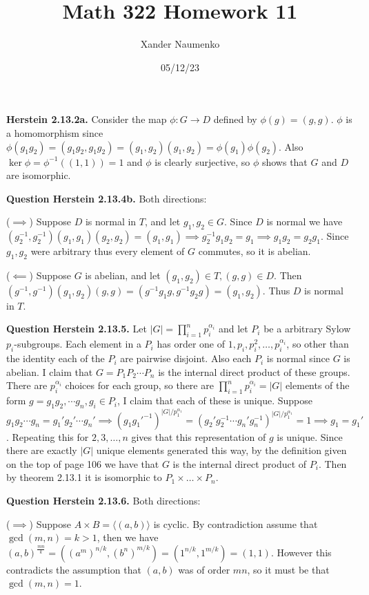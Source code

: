 \documentclass[letterpaper, reqno,11pt]{article}
\begin{document}
\title{Math 322 Homework 11}
\date{05/12/23}
\author{Xander Naumenko}
\maketitle

{\medskip\noindent\bf Herstein 2.13.2a.} Consider the map $\phi: G\to D$ defined by $\phi(g)=(g,g)$. $\phi$ is a homomorphism since $\phi(g_1g_2)=(g_1g_2,g_1g_2)=(g_1,g_2)(g_1,g_2)=\phi(g_1)\phi(g_2)$. Also $\ker\phi=\phi^{-1}((1,1))=1$ and $\phi$ is clearly surjective, so $\phi$ shows that $G$ and $D$ are isomorphic.

{\medskip\noindent\bf Question Herstein 2.13.4b.} Both directions:

($\implies$) Suppose $D$ is normal in $T$, and let $g_1,g_2\in G$. Since $D$ is normal we have $(g_2^{-1},g_2^{-1})(g_1,g_1)(g_2,g_2)=(g_1,g_1)\implies g_2^{-1}g_1g_2=g_1\implies g_1g_2=g_2g_1$. Since $g_1,g_2$ were arbitrary thus every element of $G$ commutes, so it is abelian.

($\impliedby$) Suppose $G$ is abelian, and let $(g_1,g_2)\in T,(g,g)\in D$. Then $(g^{-1},g^{-1})(g_1,g_2)(g,g)=(g^{-1}g_1g,g^{-1}g_2g)=(g_1,g_2)$. Thus $D$ is normal in $T$.

{\medskip\noindent\bf Question Herstein 2.13.5.} Let $|G|=\prod_{i=1}^{n}p_i^{\alpha_i}$ and let $P_i$ be a arbitrary Sylow $p_i$-subgroups. Each element in a $P_i$ has order one of $1,p_i,p_i^2,\ldots,p_i^{\alpha_i}$, so other than the identity each of the $P_i$ are pairwise disjoint. Also each $P_i$ is normal since $G$ is abelian. I claim that $G=P_1P_2\cdots P_n$ is the internal direct product of these groups. There are $p_i^{\alpha_i}$ choices for each group, so there are $\prod_{i=1}^{n}p_i^{\alpha_i}=|G|$ elements of the form $g=g_1g_2,\cdots g_n,g_i\in P_i$, I claim that each of these is unique. Suppose $ g_1g_2\cdots g_n=g_1'g_2'\cdots g_n'\implies (g_1g_1'^{-1})^{|G| /p_1^{\alpha_1}}=(g_2'g_2^{-1}\cdots g_n'g_n^{-1})^{|G|/p_1^{\alpha_1}}=1\implies g_1=g_1'$. Repeating this for $2,3,\ldots,n$ gives that this representation of $g$ is unique. Since there are exactly $|G|$ unique elements generated this way, by the definition given on the top of page 106 we have that $G$ is the internal direct product of $P_i$. Then by theorem 2.13.1 it is isomorphic to $P_1\times\ldots\times P_n$.

{\medskip\noindent\bf Question Herstein 2.13.6.} Both directions:

($\implies$) Suppose $A\times B= \langle( a,b )\rangle $ is cyclic. By contradiction assume that $\gcd(m,n)=k>1$, then we have $(a,b)^{\frac{mn}{k}}=\left( \left( a^{m} \right) ^{n /k},\left(b^{n}\right)^{m /k} \right) =(1^{n /k},1^{m /k})=(1,1)$. However this contradicts the assumption that $(a,b)$ was of order $mn$, so it must be that $\gcd(m,n)=1$.
\end{document}
